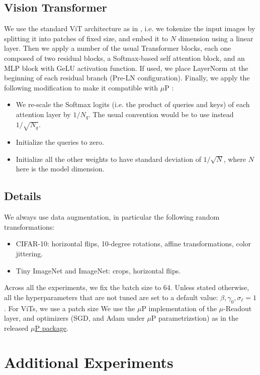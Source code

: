 \documentclass{article} %
\begin{document}
\subsection{Vision Transformer}
\label{sec:vit}
We use the standard ViT architecture as in \cite{dosovitskiy2020image}, i.e. we tokenize the input images by splitting it into patches of fixed size, and embed it to $N$ dimension using a linear layer. Then we apply a number of the usual Transformer blocks, each one composed of two residual blocks, a Softmax-based self attention block, and an MLP block with GeLU activation function. If used, we place LayerNorm at the beginning of each residual branch (Pre-LN configuration). Finally, we apply the following modification to make it compatible with $\mu$P \citep{yang2021tuning}:
\begin{itemize}
    \item We re-scale the Softmax logits (i.e. the product of queries and keys) of each attention layer by $1/N_q$. The usual convention would be to use instead $1/\sqrt{N_q}$.
    \item Initialize the queries to zero. 
    \item Initialize all the other weights to have standard deviation of $1/\sqrt{N}$, where $N$ here is the model dimension.
\end{itemize}

\subsection{Details}
We always use data augmentation, in particular the following random transformations:
\begin{itemize}
    \item CIFAR-10: horizontal flips, 10-degree rotations, affine transformations, color jittering.
    \item Tiny ImageNet and ImageNet: crops, horizontal flips.
\end{itemize}
Across all the experiments, we fix the batch size to 64. Unless stated otherwise, all the hyperparameters that are not tuned are set to a default value: $\beta, \gamma_0, \sigma_\ell=1$. For ViTs, we use a patch size 
We use the $\mu$P implementation of the $\mu$-Readout layer, and optimizers (SGD, and Adam under $\mu$P parametrizstion) as in the released \href{https://github.com/microsoft/mup}{$\mu$P package}. 

\section{Additional Experiments}
\label{app:more-exp}
\end{document}
